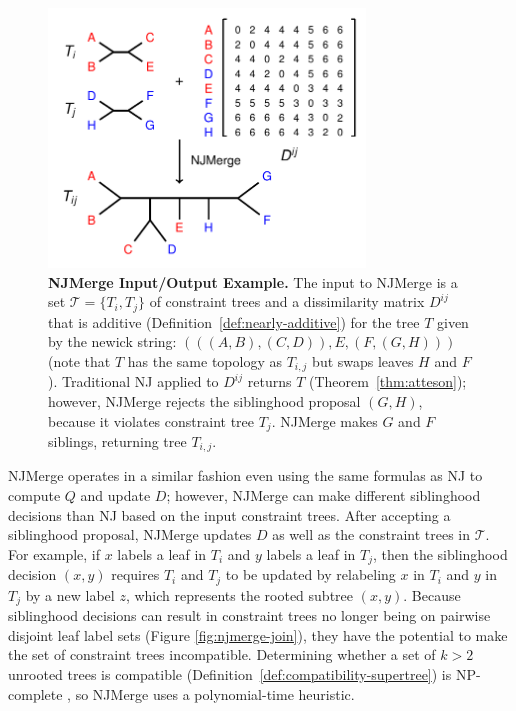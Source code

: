 \begin{figure}[!h]
\centering
\includegraphics[width=0.75\textwidth]{figures/njmerge-fig2.pdf}
\caption{
{\bf NJMerge Input/Output Example. }
The input to NJMerge is a set $\mathcal{T} = \{ T_i, T_j \}$ of constraint trees and a dissimilarity matrix $D^{ij}$ that is \gls{additive} (Definition~\ref{def:nearly-additive}) for the tree $T$ given by the \gls{newick} string: $(((A,B),(C,D)),E,(F,(G,H)))$ (note that $T$ has the same \gls{topology} as $T_{i,j}$ but swaps leaves $H$ and $F$). 
Traditional NJ applied to $D^{ij}$ returns $T$ (Theorem~\ref{thm:atteson}); however, NJMerge rejects the siblinghood proposal $(G,H)$, because it violates constraint tree $T_j$. 
NJMerge makes $G$ and $F$ siblings, returning tree $T_{i,j}$.
}
\label{fig:njmerge-io}
\end{figure}

NJMerge operates in a similar fashion even using the same formulas as NJ to compute $Q$ and update $D$; however, NJMerge can make different siblinghood decisions than NJ based on the input constraint trees.
After accepting a siblinghood proposal, NJMerge updates $D$ as well as the constraint trees in $\mathcal{T}$.
For example, if $x$ labels a leaf in $T_i$ and $y$ labels a leaf  in $T_j$, then the siblinghood decision $(x,y)$ requires $T_i$ and $T_j$ to be updated by relabeling $x$ in $T_i$ and $y$ in $T_j$ by a new label $z$, which represents the rooted subtree $(x,y)$.
Because siblinghood decisions can result in constraint trees no longer being on pairwise disjoint leaf label sets (Figure \ref{fig:njmerge-join}), they have the potential to make the set of constraint trees incompatible.
Determining whether a set of $k > 2$ unrooted trees is \gls{compatible} (Definition~\ref{def:compatibility-supertree}) is NP-complete  \cite{steel1992complexity,warnow1994tree}, so NJMerge uses a polynomial-time heuristic.

